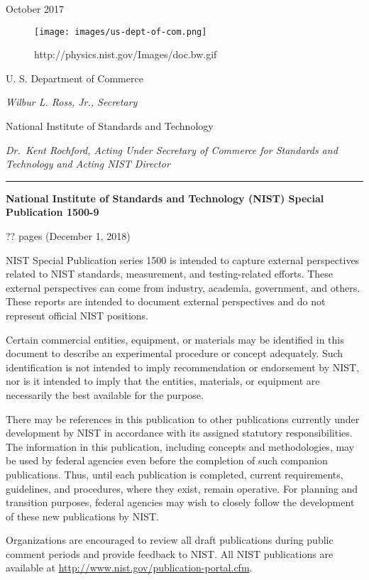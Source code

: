 \documentclass[9pt,]{article}
\begin{document}
October 2017

\begin{figure}
\centering
\texttt{[image: images/us-dept-of-com.png]}
\caption{http://physics.nist.gov/Images/doc.bw.gif}
\end{figure}

U. S. Department of Commerce

\emph{Wilbur L. Ross, Jr., Secretary}

National Institute of Standards and Technology

\emph{Dr.~Kent Rochford, Acting Under Secretary of Commerce for
Standards and Technology and Acting NIST Director}

\begin{center}\rule{0.5\linewidth}{\linethickness}\end{center}

\textbf{National Institute of Standards and Technology (NIST) Special
Publication 1500-9}

?? pages (December 1, 2018)

NIST Special Publication series 1500 is intended to capture external
perspectives related to NIST standards, measurement, and testing-related
efforts. These external perspectives can come from industry, academia,
government, and others. These reports are intended to document external
perspectives and do not represent official NIST positions.

Certain commercial entities, equipment, or materials may be identified
in this document to describe an experimental procedure or concept
adequately. Such identification is not intended to imply recommendation
or endorsement by NIST, nor is it intended to imply that the entities,
materials, or equipment are necessarily the best available for the
purpose.

There may be references in this publication to other publications
currently under development by NIST in accordance with its assigned
statutory responsibilities. The information in this publication,
including concepts and methodologies, may be used by federal agencies
even before the completion of such companion publications. Thus, until
each publication is completed, current requirements, guidelines, and
procedures, where they exist, remain operative. For planning and
transition purposes, federal agencies may wish to closely follow the
development of these new publications by NIST.

Organizations are encouraged to review all draft publications during
public comment periods and provide feedback to NIST. All NIST
publications are available at
\url{http://www.nist.gov/publication-portal.cfm}.
\end{document}
